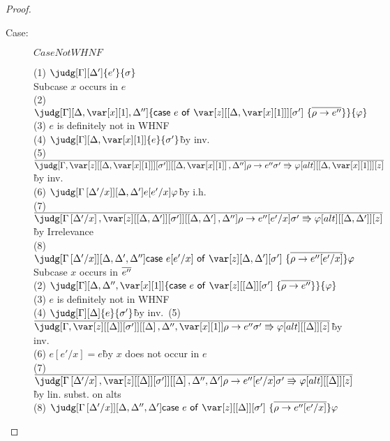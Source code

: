 \begin{proof}
\begin{description}
\item[Case:] $CaseNotWHNF$
\begin{tabbing}
  (1) $\judg[\G][\D']{e'}{\s}$\\
  Subcase $x$ occurs in $e$\\
    (2) $\judg[\G][\D,\xl,\D'']{\ccase{e}{\z[\irr{\D,\xl}][\s']~\{\ov{\rho\to e''}\}}}{\vp}$\\
    (3) $e$ is definitely not in WHNF\\
    (4) $\judg[\G][\D,\xl]{e}{\s'}$\`by inv.\\
    (5) $\ov{\judg[\G,\zr{\irr{\D,\xl}}{\s'}][\irr{\D,\xl},\D'']{\rho\to e''}{\s' \Rrightarrow \vp}[alt][\irr{\D,\xl}][z]}$\`by inv.\\
    (6) $\judg[\subst{\G}{\D'}{x}][\D,\D']{e[e'/x]}{\vp}$\`by i.h.\\
    (7) $\ov{\judg[\subst{\G}{\D'}{x},\zr{\irr{\D,\D'}}{\s'}][\irr{\D,\D'},\D'']{\rho\to e''[e'/x]}{\s' \Rrightarrow \vp}[alt][\irr{\D,\D'}][z]}$ \` by Irrelevance\\
    (8) $\judg[\subst{\G}{\D'}{x}][\D,\D',\D'']{\ccase{e[e'/x]}{\z[\D,\D'][\s']~\{\ov{\rho\to e''[e'/x]}\}}}{\vp}$\\
  Subcase $x$ occurs in $\overline{e''}$\\
    (2) $\judg[\G][\D,\D'',\xl]{\ccase{e}{\z[\irr{\D}][\s']~\{\ov{\rho\to e''}\}}}{\vp}$\\
    (3) $e$ is definitely not in WHNF\\
    (4) $\judg[\G][\D]{e}{\s'}$\`by inv.\
    (5) $\ov{\judg[\G,\zr{\irr{\D}}{\s'}][\irr{\D},\D'',\xl]{\rho\to e''}{\s' \Rrightarrow \vp}[alt][\irr{\D}][z]}$\`by inv.\\
    (6) $e[e'/x] = e$\` by $x$ does not occur in $e$\\
    (7) $\ov{\judg[\subst{\G}{\D'}{x},\zr{\irr{\D}}{\s'}][\irr{\D},\D'',\D']{\rho\to e''[e'/x]}{\s' \Rrightarrow \vp}[alt][\irr{\D}][z]}$\`by lin. subst. on alts\\
    (8) $\judg[\subst{\G}{\D'}{x}][\D,\D'',\D']{\ccase{e}{\z[\irr{\D}][\s']~\{\ov{\rho\to e''[e'/x]}\}}}{\vp}$\\
\end{tabbing}



\end{description}
\end{proof}


